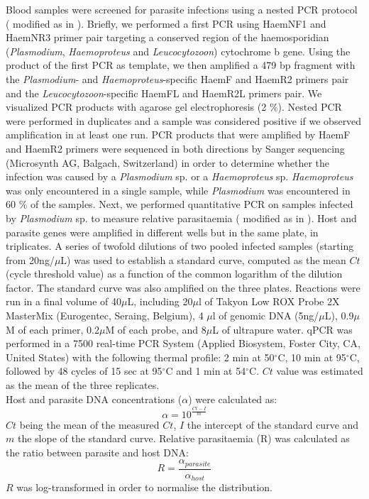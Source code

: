 \documentclass[10pt, twoside]{book} %
\begin{document}
Blood samples were screened for parasite infections using a nested PCR protocol (\citealt{Hellgren2004} modified as in \citealt{Jenkins2015}). Briefly, we performed a first PCR using HaemNF1 and HaemNR3 primer pair targeting a conserved region of the haemosporidian (\textit{Plasmodium}, \textit{Haemoproteus} and \textit{Leucocytozoon}) cytochrome b gene. Using the product of the first PCR as template, we then amplified a 479 bp fragment with the \textit{Plasmodium}- and \textit{Haemoproteus}-specific HaemF and HaemR2 primers pair and the \textit{Leucocytozoon}-specific HaemFL and HaemR2L primers pair. We visualized PCR products with agarose gel electrophoresis (2 \%). Nested PCR were performed in duplicates and a sample was considered positive if we observed amplification in at least one run. PCR products that were amplified by HaemF and HaemR2 primers were sequenced in both directions by Sanger sequencing (Microsynth AG, Balgach, Switzerland) in order to determine whether the infection was caused by a \textit{Plasmodium} sp. or a \textit{Haemoproteus} sp. \textit{Haemoproteus} was only encountered in a single sample, while \textit{Plasmodium} was encountered in 60 \% of the samples. Next, we performed quantitative PCR on samples infected by \textit{Plasmodium} sp. to measure relative parasitaemia (\citealt{Christe2012} modified as in \citealt{Jenkins2015}). Host and parasite genes were amplified in different wells but in the same plate, in triplicates. A series of twofold dilutions of two pooled infected samples (starting from 20ng/$\mu$L) was used to establish a standard curve, computed as the mean $Ct$ (cycle threshold value) as a function of the common logarithm of the dilution factor. The standard curve was also amplified on the three plates. Reactions were run in a final volume of 40$\mu$L, including 20$\mu$l of Takyon Low ROX Probe 2X MasterMix (Eurogentec, Seraing, Belgium), 4 $\mu$l of genomic DNA (5ng/$\mu$L), 0.9$\mu$M of each primer, 0.2$\mu$M of each probe, and 8$\mu$L of ultrapure water. qPCR was performed in a 7500 real-time PCR System (Applied Biosystem, Foster City, CA, United States) with the following thermal profile: 2 min at 50$^{\circ}$C, 10 min at 95$^{\circ}$C, followed by 48 cycles of 15 sec at 95$^{\circ}$C and 1 min at 54$^{\circ}$C. $Ct$ value was estimated as the mean of the three replicates. \\

\noindent Host and parasite DNA concentrations ($\alpha$) were calculated as:
\begin{equation*}
	\alpha = 10^{\frac{Ct-I}{m}}
\end{equation*}
$Ct$ being the mean of the measured $Ct$, $I$ the intercept of the standard curve and $m$ the slope of the standard curve. Relative parasitaemia (R) was calculated as the ratio between parasite and host DNA:
\begin{equation*}
	R = \frac{\alpha_{parasite}}{\alpha_{host}}
\end{equation*}
$R$ was log-transformed in order to normalise the distribution.
\end{document}
